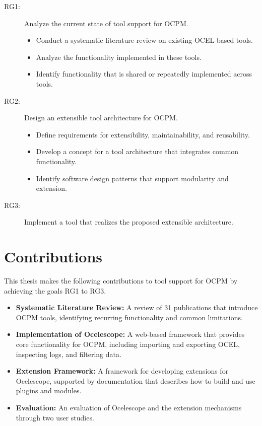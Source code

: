 \begin{description}
	\item[RG1:] Analyze the current state of tool support for OCPM.
	      \begin{itemize}
		      \item Conduct a systematic literature review on existing OCEL-based tools.
		      \item Analyze the functionality implemented in these tools.
		      \item Identify functionality that is shared or repeatedly implemented across tools.
	      \end{itemize}

	\item[RG2:] Design an extensible tool architecture for OCPM.
	      \begin{itemize}
		      \item Define requirements for extensibility, maintainability, and reusability.
		      \item Develop a concept for a tool architecture that integrates common functionality.
		      \item Identify software design patterns that support modularity and extension.
	      \end{itemize}

	\item[RG3:] Implement a tool that realizes the proposed extensible architecture.
\end{description}

\section{Contributions}

This thesis makes the following contributions to tool support for OCPM by achieving the goals RG1 to RG3.

\begin{itemize}
	\item \textbf{Systematic Literature Review:} A review of 31 publications that introduce OCPM tools, identifying recurring functionality and common limitations.
	\item \textbf{Implementation of Ocelescope:} A web-based framework that provides core functionality for OCPM, including importing and exporting OCEL, inspecting logs, and filtering data.
	\item \textbf{Extension Framework:} A framework for developing extensions for Ocelescope, supported by documentation that describes how to build and use plugins and modules.
	\item \textbf{Evaluation:} An evaluation of Ocelescope and the extension mechanisms through two user studies.
\end{itemize}

